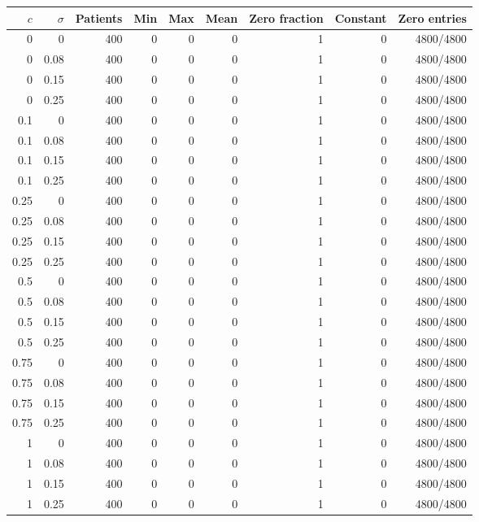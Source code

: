 \begin{center}\small
\begin{tabular}{rrrrrrrrr}
\toprule
$c$ & $\sigma$ & Patients & Min & Max & Mean & Zero fraction & Constant & Zero entries\\
\midrule
0 & 0 & 400 & 0 & 0 & 0 & 1 & 0 & 4800/4800 \\
0 & 0.08 & 400 & 0 & 0 & 0 & 1 & 0 & 4800/4800 \\
0 & 0.15 & 400 & 0 & 0 & 0 & 1 & 0 & 4800/4800 \\
0 & 0.25 & 400 & 0 & 0 & 0 & 1 & 0 & 4800/4800 \\
0.1 & 0 & 400 & 0 & 0 & 0 & 1 & 0 & 4800/4800 \\
0.1 & 0.08 & 400 & 0 & 0 & 0 & 1 & 0 & 4800/4800 \\
0.1 & 0.15 & 400 & 0 & 0 & 0 & 1 & 0 & 4800/4800 \\
0.1 & 0.25 & 400 & 0 & 0 & 0 & 1 & 0 & 4800/4800 \\
0.25 & 0 & 400 & 0 & 0 & 0 & 1 & 0 & 4800/4800 \\
0.25 & 0.08 & 400 & 0 & 0 & 0 & 1 & 0 & 4800/4800 \\
0.25 & 0.15 & 400 & 0 & 0 & 0 & 1 & 0 & 4800/4800 \\
0.25 & 0.25 & 400 & 0 & 0 & 0 & 1 & 0 & 4800/4800 \\
0.5 & 0 & 400 & 0 & 0 & 0 & 1 & 0 & 4800/4800 \\
0.5 & 0.08 & 400 & 0 & 0 & 0 & 1 & 0 & 4800/4800 \\
0.5 & 0.15 & 400 & 0 & 0 & 0 & 1 & 0 & 4800/4800 \\
0.5 & 0.25 & 400 & 0 & 0 & 0 & 1 & 0 & 4800/4800 \\
0.75 & 0 & 400 & 0 & 0 & 0 & 1 & 0 & 4800/4800 \\
0.75 & 0.08 & 400 & 0 & 0 & 0 & 1 & 0 & 4800/4800 \\
0.75 & 0.15 & 400 & 0 & 0 & 0 & 1 & 0 & 4800/4800 \\
0.75 & 0.25 & 400 & 0 & 0 & 0 & 1 & 0 & 4800/4800 \\
1 & 0 & 400 & 0 & 0 & 0 & 1 & 0 & 4800/4800 \\
1 & 0.08 & 400 & 0 & 0 & 0 & 1 & 0 & 4800/4800 \\
1 & 0.15 & 400 & 0 & 0 & 0 & 1 & 0 & 4800/4800 \\
1 & 0.25 & 400 & 0 & 0 & 0 & 1 & 0 & 4800/4800 \\
\bottomrule
\end{tabular}
\end{center}

